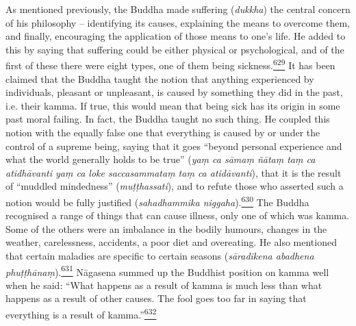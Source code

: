 As mentioned previously, the Buddha made suffering (\emph{dukkha}) the
central concern of his philosophy -- identifying its causes, explaining
the means to overcome them, and finally, encouraging the application of
those means to one's life. He added to this by saying that suffering
could be either physical or psychological, and of the first of these
there were eight types, one of them being
sickness.\label{footprints_split_015.html_fnref629}\hyperref[footprints_split_025.htmlux5cux23fn629]{\textsuperscript{629}}
It has been claimed that the Buddha taught the notion that anything
experienced by individuals, pleasant or unpleasant, is caused by
something they did in the past, i.e. their kamma. If true, this would
mean that being sick has its origin in some past moral failing. In fact,
the Buddha taught no such thing. He coupled this notion with the equally
false one that everything is caused by or under the control of a supreme
being, saying that it goes ``beyond personal experience and what the
world generally holds to be true'' (\emph{yaṃ ca sāmaṃ ñātaṃ taṃ ca
atidhāvanti yaṃ ca loke saccasammataṃ taṃ ca atidāvanti}), that it is
the result of ``muddled mindedness'' (\emph{muṭṭhassati}), and to refute
those who asserted such a notion would be fully justified
(\emph{sahadhammika
niggaha}).\label{footprints_split_015.html_fnref630}\hyperref[footprints_split_025.htmlux5cux23fn630]{\textsuperscript{630}}
The Buddha recognised a range of things that can cause illness, only one
of which was kamma. Some of the others were an imbalance in the bodily
humours, changes in the weather, carelessness, accidents, a poor diet
and overeating. He also mentioned that certain maladies are specific to
certain seasons (\emph{sāradikena abadhena
phuṭṭhānaṃ}).\label{footprints_split_015.html_fnref631}\hyperref[footprints_split_025.htmlux5cux23fn631]{\textsuperscript{631}}
Nāgasena summed up the Buddhist position on kamma well when he said:
``What happens as a result of kamma is much less than what happens as a
result of other causes. The fool goes too far in saying that everything
is a result of
kamma.''\label{footprints_split_015.html_fnref632}\hyperref[footprints_split_025.htmlux5cux23fn632]{\textsuperscript{632}}


